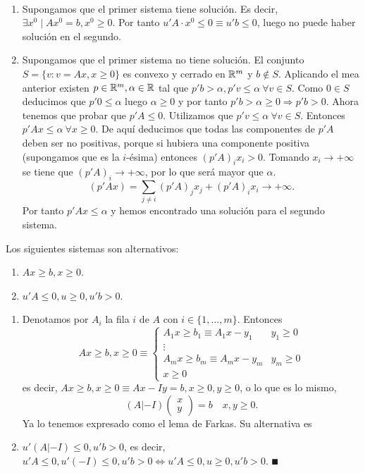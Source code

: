 \documentclass[PM.tex]{subfiles}
\begin{document}
\begin{dem}\
\begin{enumerate}
\item Supongamos que el primer sistema tiene solución. Es decir, $\exists x^0\mid Ax^0=b, x^0\geq 0$. Por tanto $u'A\cdot x^0\leq 0\equiv u'b\leq 0$, luego no puede haber solución en el segundo.
\item Supongamos que el primer sistema no tiene solución. El conjunto $S=\{v: v=Ax,x\geq 0\}$ es convexo y cerrado en $\mathbb{R}^m$ y $b\not\in S$. Aplicando el mea anterior existen $p\in\mathbb{R}^m,\alpha\in\mathbb{R}$ tal que $p'b>\alpha, p'v\leq\alpha\ \forall v\in S$. Como $0\in S$ deducimos que $p'0\leq\alpha$ luego $\alpha\geq 0$ y por tanto $p'b>\alpha\geq 0\Rightarrow p'b>0$. Ahora tenemos que probar que $p'A\leq 0$. Utilizamos que $p'v\leq\alpha\ \forall v\in S$. Entonces $p'Ax\leq\alpha\ \forall x\geq 0$. De aquí deducimos que todas las componentes de $p'A$ deben ser no positivas, porque si hubiera una componente positiva (supongamos que es la $i$-ésima) entonces $(p'A)_ix_i>0$. Tomando $x_i\rightarrow +\infty$ se tiene que $(p'A)_i\rightarrow +\infty$, por lo que será mayor que $\alpha$.
\[
(p'Ax)=\sum_{j\neq i}(p'A)_jx_j + (p'A)_ix_i \rightarrow +\infty.
\]
Por tanto  $p'Ax\leq\alpha$ y hemos encontrado una solución para el segundo sistema.
\end{enumerate}
\end{dem}

\begin{coro}
Los siguientes sistemas son alternativos:
\begin{enumerate}
\item $Ax\geq b, x\geq 0$.
\item $u'A\leq 0, u\geq 0, u'b>0$. 
\end{enumerate}
\end{coro}
\begin{dem}
\begin{enumerate}
\item Denotamos por $A_i$ la fila $i$ de $A$ con $i\in\{1,\dots,m\}$. Entonces 
\[
Ax\geq b, x\geq 0 \equiv\begin{cases}
A_1x\geq b_1\equiv A_1x-y_1 & y_1\geq 0\\
\vdots & \\
A_mx\geq b_m\equiv A_mx-y_m & y_m\geq 0\\
x\geq 0 & 
\end{cases}
\]
es decir, $Ax\geq b, x\geq 0 \equiv Ax-Iy=b, x\geq 0, y\geq 0$, o lo que es lo mismo,
\[(A| -I)\begin{pmatrix}
x\\
y
\end{pmatrix}=b\quad x,y\geq 0.
\]
Ya lo tenemos expresado como el lema de Farkas. Su alternativa es 
\item $u'(A| -I)\leq 0, u'b>0$, es decir, $u'A\leq 0, u'(-I)\leq 0, u'b>0 \Leftrightarrow u'A\leq 0, u\geq 0, u'b>0$. $\QED$
\end{enumerate}
\end{dem}
\end{document}
